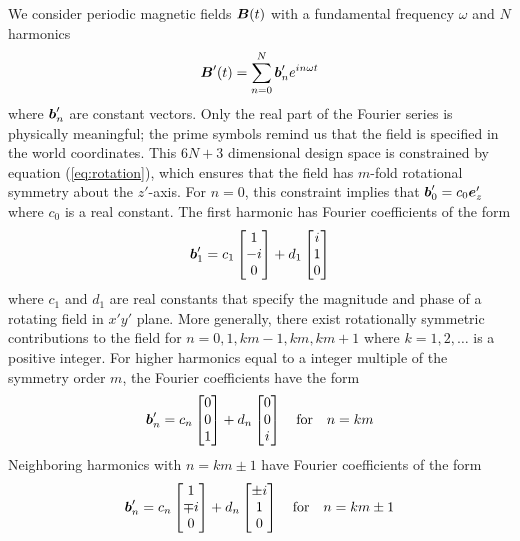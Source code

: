 We consider periodic magnetic fields $\boldsymbol{B}(t)$ with a fundamental frequency $\omega$ and $N$ harmonics
\begin{equation}
    \boldsymbol{B}'(t) = \sum_{n=0}^N \boldsymbol{b}'_n e^{i n \omega t}
\end{equation}
where $\boldsymbol{b}'_n$ are constant vectors. Only the real part of the Fourier series is physically meaningful; the prime symbols remind us that the field is specified in the world coordinates.  This $6N+3$ dimensional design space is constrained by equation (\ref{eq:rotation}), which ensures that the field has $m$-fold rotational symmetry about the $z'$-axis. For $n=0$, this constraint implies that $\boldsymbol{b}'_0 = c_0 \boldsymbol{e}'_{z}$ where $c_0$ is a real constant. The first harmonic has Fourier coefficients of the form 
\begin{equation}
    \boldsymbol{b}'_1 = c_1 \begin{bmatrix} 1\\-i\\0\\ \end{bmatrix} + d_1 \begin{bmatrix} i\\1\\0 \end{bmatrix}
\end{equation}
where $c_1$ and $d_1$ are  real constants that specify the magnitude and phase of a rotating field in $x'y'$ plane. More generally, there exist rotationally symmetric contributions to the field for $n=0, 1, k m-1, k m, k m + 1$  where $k= 1,2,\dots$ is a positive integer. For higher harmonics equal to a integer multiple of the symmetry order $m$, the Fourier coefficients have the form
\begin{equation}
    \boldsymbol{b}'_{n} = c_{n} \begin{bmatrix} 0\\0\\1 \end{bmatrix} + d_{n} \begin{bmatrix} 0\\0\\i \end{bmatrix} \quad \text{for} \quad n=km
\end{equation}
Neighboring harmonics with $n=km\pm 1$ have Fourier coefficients of the form
\begin{equation}
    \boldsymbol{b}'_{n} = c_{n} \begin{bmatrix} 1\\\mp i \\0\end{bmatrix} + d_{n} \begin{bmatrix} \pm i\\1\\0 \end{bmatrix} \quad \text{for} \quad n=km \pm 1
\end{equation}
